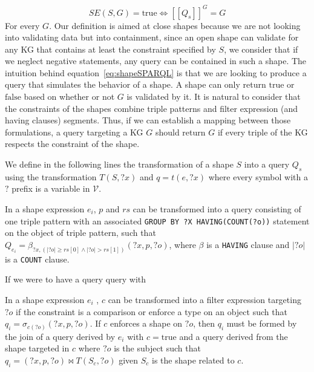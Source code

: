 \begin{equation}\label{eq:shapeSPARQL}
   SE(S,G) = \mathrm{true} \iff [\![ Q_s ]\!]^{G} =  G
\end{equation}
For every $G$.
Our definition is aimed at close shapes because we are not looking into validating data but into containment, since an open shape can validate 
for any KG that contains at least the constraint specified by $S$, we consider that if we neglect negative statements, any query can be contained in such a shape.
The intuition behind equation~\ref{eq:shapeSPARQL} is that we are looking to produce a query that simulates the behavior of a shape.
A shape can only return $\mathrm{true}$ or $\mathrm{false}$ based on whether or not $G$ is validated by it.
It is natural to consider that the constraints of the shapes combine triple patterns and filter expression (and having clauses) segments.
Thus, if we can establish a mapping between those formulations, a query targeting a KG $G$ should return $G$ if every triple of the 
KG respects the constraint of the shape.

We define in the following lines the transformation of a shape $S$ into a query $Q_s$ using the transformation $T(S,?x)$ and $q = t(e, ?x)$ where every 
symbol with a $?$ prefix is a variable in $\mathcal{V}$. 


\iffalse
INSPIRE YOURSELF BY Corman2019 style
\fi

\begin{prop}\label{prop:triplePattern}
   In a shape expression $e_i$, $p$ and $rs$ can be transformed into a query consisting of one triple pattern with an associated \texttt{GROUP BY ?X HAVING(COUNT(?o))} statement on the object of triple pattern,
   such that
   $Q_{e_i} = \beta_{?x, (|?o| \geq rs[0] \land |?o| > rs[1])}(?x, p, ?o)$,
   where $\beta$ is a \texttt{HAVING} clause and $|?o|$ is a \texttt{COUNT} clause. 
\end{prop}

If we were to have a query query with

\begin{prop}
   In a shape expression $e_i$ , $c$ can be transformed into a filter expression targeting $?o$ if the constraint is a comparison or enforce a type on an object such that
   $q_{i} = \sigma_{c(?o)}(?x, p, ?o)$. 
   If $c$ enforces a shape on $?o$, then $q_i$ must be formed by the join of a query derived by $e_i$ with $c = \mathrm{true}$ and a query derived from the shape targeted in $c$ where $?o$ is the subject 
   such that $q_{i}= (?x, p, ?o) \bowtie T(S_c,?o)$ given $S_c$ is the shape related to $c$.
\end{prop}

